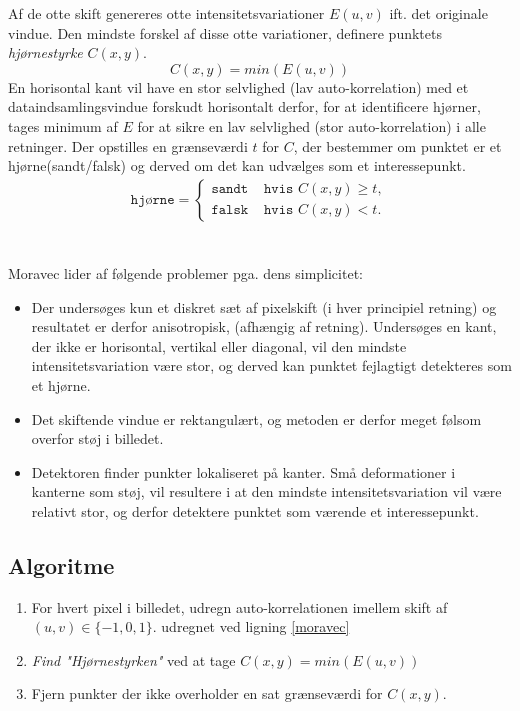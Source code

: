 Af de otte skift genereres otte intensitetsvariationer $E(u,v)$ ift. det originale vindue. Den mindste forskel af disse otte variationer, definere punktets \textit{hjørnestyrke} $C(x,y).$
$$
C(x,y)=min(E(u,v))
$$
En horisontal kant vil have en stor selvlighed (lav auto-korrelation) med et dataindsamlingsvindue forskudt horisontalt derfor, for at identificere hjørner, tages minimum af $E$ for at sikre en lav selvlighed (stor auto-korrelation) i alle retninger. 
Der opstilles en grænseværdi $t$ for $C$, der bestemmer om punktet er et hjørne(sandt/falsk) og derved om det kan udvælges som et interessepunkt.
\begin{equation}
\begin{split}
\texttt{hjørne} = 
\begin{cases}
\texttt{sandt}& \texttt{hvis } C(x,y)\geq t, \\
\texttt{falsk }& \texttt{hvis } C(x,y) < t.
\end{cases}
\end{split}
\label{cornerind}
\end{equation}
 \\ \\
Moravec lider af følgende problemer pga. dens simplicitet:
\begin{itemize}
\item{Der undersøges kun et diskret sæt af pixelskift (i hver principiel retning) og resultatet er derfor anisotropisk, (afhængig af retning). Undersøges en kant, der ikke er horisontal, vertikal eller diagonal, vil den mindste intensitetsvariation være stor, og derved kan punktet fejlagtigt detekteres som et hjørne.}
\item{Det skiftende vindue er rektangulært, og metoden er derfor meget følsom overfor støj i billedet.}
\item{Detektoren finder punkter lokaliseret på kanter. Små deformationer i kanterne som støj, vil resultere i at den mindste intensitetsvariation vil være relativt stor, og derfor detektere punktet som værende et interessepunkt.}
\end{itemize}
\subsection{Algoritme}
\begin{enumerate}
\item{For hvert pixel i billedet, udregn auto-korrelationen imellem skift af $(u,v) \in \lbrace-1,0,1\rbrace$. udregnet ved ligning \ref{moravec}}
\item{\textit{Find "Hjørnestyrken"} ved at tage $C(x,y)=min(E(u,v))$}
\item{Fjern punkter der ikke overholder en sat grænseværdi for $C(x,y)$.}
\end{enumerate}
